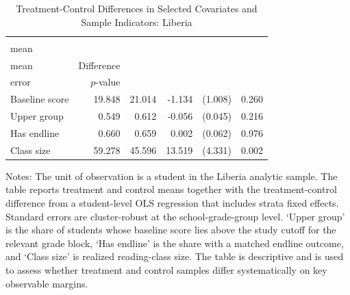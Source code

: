 \begin{table}[htbp]
\caption{Treatment-Control Differences in Selected Covariates and Sample Indicators: Liberia}
\label{tab:lib_balance}
\begin{center}
\begin{small}
\begin{threeparttable}
\begin{tabular}{l*{5}{r}}
\toprule
 & \Longstack{Treatment\\ mean} & \Longstack{Control\\ mean} & Difference & \Longstack{Standard\\ error} & $p$-value \\
\midrule
Baseline score & 19.848 & 21.014 & -1.134 & (1.008) & 0.260 \\
Upper group & 0.549 & 0.612 & -0.056 & (0.045) & 0.216 \\
Has endline & 0.660 & 0.659 & 0.002 & (0.062) & 0.976 \\
Class size & 59.278 & 45.596 & 13.519 & (4.331) & 0.002 \\
\bottomrule
\end{tabular}
\begin{tablenotes}
\footnotesize \item Notes: The unit of observation is a student in the Liberia analytic sample. The table reports treatment and control means together with the treatment-control difference from a student-level OLS regression that includes strata fixed effects. Standard errors are cluster-robust at the school-grade-group level. `Upper group' is the share of students whose baseline score lies above the study cutoff for the relevant grade block, `Has endline' is the share with a matched endline outcome, and `Class size' is realized reading-class size. The table is descriptive and is used to assess whether treatment and control samples differ systematically on key observable margins.
\end{tablenotes}
\end{threeparttable}
\end{small}
\end{center}
\end{table}